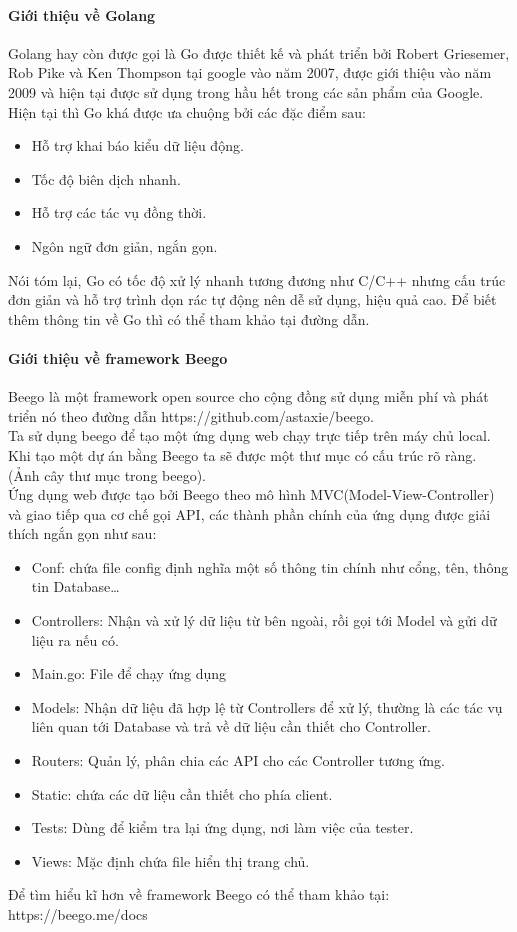 \paragraph{Giới thiệu về Golang\\}
Golang hay còn được gọi là Go được thiết kế và phát triển bởi Robert Griesemer, Rob Pike và Ken Thompson tại google vào năm 2007, được giới thiệu vào năm 2009 và hiện tại được sử dụng trong hầu hết trong các sản phẩm của Google. Hiện tại thì Go khá được ưa chuộng bởi các đặc điểm sau:
\begin{itemize}
    \item Hỗ trợ khai báo kiểu dữ liệu động.
    \item Tốc độ biên dịch nhanh.
    \item Hỗ trợ các tác vụ đồng thời.
    \item Ngôn ngữ đơn giản, ngắn gọn.
\end{itemize}
Nói tóm lại, Go có tốc độ xử lý nhanh tương đương như C/C++ nhưng cấu trúc đơn giản và hỗ trợ trình dọn rác tự động nên dễ sử dụng, hiệu quả cao. Để biết thêm thông tin về Go thì có thể tham khảo tại đường dẫn.

\paragraph{Giới thiệu về framework Beego\\}
Beego là một framework open source cho cộng đồng sử dụng miễn phí và phát triển nó theo đường dẫn https://github.com/astaxie/beego.\\
Ta sử dụng beego để tạo một ứng dụng web chạy trực tiếp trên máy chủ local. Khi tạo một dự án bằng Beego ta sẽ được một thư mục có cấu trúc rõ ràng.\\
(Ảnh cây thư mục trong beego).\\
Ứng dụng web được tạo bởi Beego theo mô hình MVC(Model-View-Controller) và giao tiếp qua cơ chế gọi API, các thành phần chính của ứng dụng được giải thích ngắn gọn như sau:\\
\begin{itemize}
    \item Conf: chứa file config định nghĩa một số thông tin chính như cổng, tên, thông tin Database…
    \item Controllers: Nhận và xử lý dữ liệu từ bên ngoài, rồi gọi tới Model và gửi dữ liệu ra nếu có.
    \item Main.go: File để chạy ứng dụng
    \item Models: Nhận dữ liệu đã hợp lệ từ Controllers để xử lý, thường là các tác vụ liên quan tới Database và trả về dữ liệu cần thiết cho Controller.
    \item Routers: Quản lý, phân chia các API cho các Controller tương ứng.
    \item Static: chứa các dữ liệu cần thiết cho phía client.
    \item Tests: Dùng để kiểm tra lại ứng dụng, nơi làm việc của tester.
    \item Views: Mặc định chứa file hiển thị trang chủ.
\end{itemize}
Để tìm hiểu kĩ hơn về framework Beego có thể tham khảo tại: https://beego.me/docs
